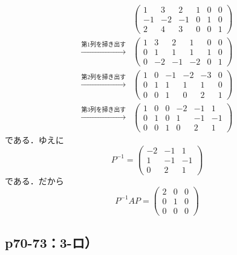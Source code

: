 \documentclass[uplatex,dvipdfmx,a4paper,10pt,fleqn]{jsarticle}
\begin{document}
    \begin{leftbar}
    \begin{align*} 
    &
    \left( 
        \begin{array}{ccc|ccc}
        1 & 3 & 2 & 1 & 0 & 0 \\
        -1 & -2 & -1 & 0 & 1 & 0 \\
        2 & 4 & 3 &  0 & 0 & 1
        \end{array}
        \right) \\
       \xrightarrow{\text{第$1$列を掃き出す}} &
    \left( 
        \begin{array}{ccc|ccc}
        1 & 3 & 2 & 1 & 0 & 0 \\
        0 & 1 & 1 & 1 & 1 & 0 \\
        0 & -2 & -1 &  -2 & 0 & 1
        \end{array}
        \right) \\
       \xrightarrow{\text{第$2$列を掃き出す}} &
       \left( 
           \begin{array}{ccc|ccc}
           1 & 0 & -1 & -2 & -3 & 0 \\
           0 & 1 & 1 & 1 & 1 & 0 \\
           0 & 0 & 1 &  0 & 2 & 1 
           \end{array}
           \right) \\
       \xrightarrow{\text{第$3$列を掃き出す}} &
       \left( 
           \begin{array}{ccc|ccc}
            1 & 0 & 0 & -2 & -1 & 1 \\
            0 & 1 & 0 & 1 & -1 & -1 \\
            0 & 0 & 1 &  0 & 2 & 1 
           \end{array}
           \right) 
        \end{align*}
        である．ゆえに
        \[
            P^{-1} = \begin{pmatrix} -2 & -1 & 1\\ 1 & -1 & -1 \\ 0 & 2 & 1 \end{pmatrix}
        \]
        である．だから
        \[
            P^{-1} A P = \begin{pmatrix} 2 & 0 & 0 \\ 0 & 1 & 0 \\ 0 & 0 & 0 \end{pmatrix}
        \]
    \end{leftbar}


    \subsection*{p70-73：3-ロ）}
\end{document}
